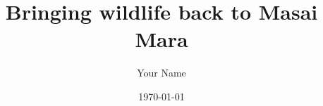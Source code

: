\usepackage{newtxtext}%
\usepackage{lipsum}
\title{Bringing wildlife back to Masai Mara}
\author{Your Name}
\date{\today}
\usepackage{indentfirst}
\usepackage{multirow}
\usepackage{multicol}
\usepackage{arydshln}
\usepackage{leftidx}
\usepackage{float}
\usepackage{graphicx}
\usepackage{setspace}
\usepackage[shortlabels]{enumitem}
\usepackage{booktabs}
\usepackage{array} 
\newtheorem{thm}{Theorem}[section]
\usepackage{cite}
\usepackage{hyperref}
\usepackage{booktabs}
\usepackage{subfigure}
\renewcommand{\headrulewidth}{0pt}
\pagestyle{fancy}
\fancyhf{} %
\fancyfoot[C]{\thepage} %
\renewcommand{\headrulewidth}{0pt} %
\renewcommand{\footrulewidth}{0pt} %
\usepackage{fontspec}
\setmainfont{Arial}